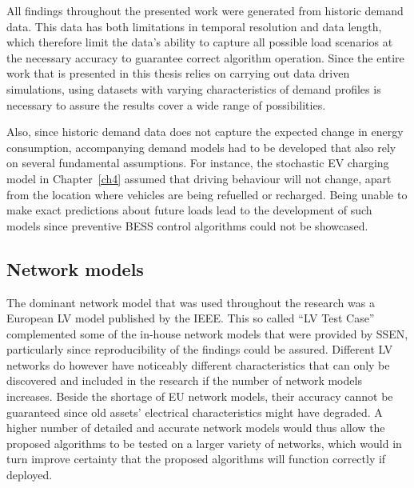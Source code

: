 All findings throughout the presented work were generated from historic demand data.
This data has both limitations in temporal resolution and data length, which therefore limit the data's ability to capture all possible load scenarios at the necessary accuracy to guarantee correct algorithm operation.
Since the entire work that is presented in this thesis relies on carrying out data driven simulations, using datasets with varying characteristics of demand profiles is necessary to assure the results cover a wide range of possibilities.

Also, since historic demand data does not capture the expected change in energy consumption, accompanying demand models had to be developed that also rely on several fundamental assumptions.
For instance, the stochastic EV charging model in Chapter~\ref{ch4} assumed that driving behaviour will not change, apart from the location where vehicles are being refuelled or recharged.
Being unable to make exact predictions about future loads lead to the development of such models since preventive BESS control algorithms could not be showcased.

\subsection{Network models}

The dominant network model that was used throughout the research was a European LV model published by the IEEE.
This so called ``LV Test Case'' complemented some of the in-house network models that were provided by SSEN, particularly since reproducibility of the findings could be assured.
Different LV networks do however have noticeably different characteristics that can only be discovered and included in the research if the number of network models increases.
Beside the shortage of EU network models, their accuracy cannot be guaranteed since old assets' electrical characteristics might have degraded.
A higher number of detailed and accurate network models would thus allow the proposed algorithms to be tested on a larger variety of networks, which would in turn improve certainty that the proposed algorithms will function correctly if deployed.
